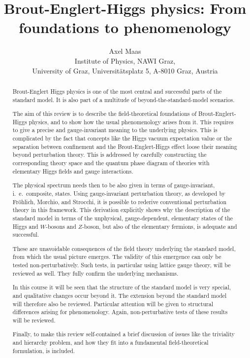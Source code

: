 \documentclass[final,12pt]{article}
\newcommand*{\1}{1\!\!\!\bot}
\begin{document}
 
\title{Brout-Englert-Higgs physics: From foundations to phenomenology}%

\author{Axel Maas\\
Institute of Physics, NAWI Graz,\\ University of Graz, Universit\"atsplatz 5, A-8010 Graz, Austria}

\maketitle

\begin{abstract}

Brout-Englert Higgs physics is one of the most central and successful parts of the standard model. It is also part of a multitude of beyond-the-standard-model scenarios.

The aim of this review is to describe the field-theoretical foundations of Brout-Englert-Higgs physics, and to show how the usual phenomenology arises from it. This requires to give a precise and gauge-invariant meaning to the underlying physics. This is complicated by the fact that concepts like the Higgs vacuum expectation value or the separation between confinement and the Brout-Englert-Higgs effect loose their meaning beyond perturbation theory. This is addressed by carefully constructing the corresponding theory space and the quantum phase diagram of theories with elementary Higgs fields and gauge interactions.

The physical spectrum needs then to be also given in terms of gauge-invariant, i.\ e.\ composite, states. Using gauge-invariant perturbation theory, as developed by Fr\"ohlich, Morchio, and Strocchi, it is possible to rederive conventional perturbation theory in this framework. This derivation explicitly shows why the description of the standard model in terms of the unphysical, gauge-dependent, elementary states of the Higgs and $W$-bosons and $Z$-boson, but also of the elementary fermions, is adequate and successful.

These are unavoidable consequences of the field theory underlying the standard model, from which the usual picture emerges. The validity of this emergence can only be tested non-perturbatively. Such tests, in particular using lattice gauge theory, will be reviewed as well. They fully confirm the underlying mechanisms.

In this course it will be seen that the structure of the standard model is very special, and qualitative changes occur beyond it. The extension beyond the standard model will therefore also be reviewed. Particular attention will be given to structural differences arising for phenomenology. Again, non-perturbative tests of these results will be reviewed.

Finally, to make this review self-contained a brief discussion of issues like the triviality and hierarchy problem, and how they fit into a fundamental field-theoretical formulation, is included.

\end{abstract}
\end{document}
